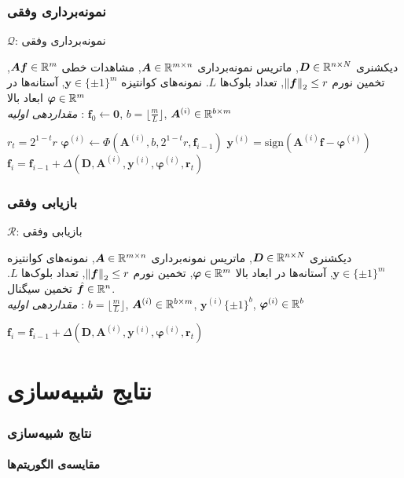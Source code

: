 \begin{frame}
\frametitle{نمونه‌برداری وفقی}
\begin{algorithm}[H]
	\caption{$ \mathcal{Q} $: نمونه‌برداری وفقی}
	\label{alg:AQ}
	\begin{algorithmic}[1]
		\renewcommand{\algorithmicrequire}{\textbf{ورودی:}}
		\renewcommand{\algorithmicensure}{\textbf{خروجی:}}
		\REQUIRE دیکشنری $ \bm{D}\in\mathbb{R}^{n\times N} $, ماتریس نمونه‌برداری $ \bm{A}\in\mathbb{R}^{m\times n} $, مشاهدات خطی $ \bm{Af}\in \mathbb{R}^{m} $, تخمین نورم $ \left\lVert\bm{f}\right\rVert_{2}\leq r $, تعداد بلوک‌ها $ L $.
		\ENSURE  نمونه‌های کوانتیزه $ \bm{y} \in \lbrace\pm 1\rbrace^{m} $, آستانه‌ها در ابعاد بالا $ \bm{\varphi} \in \mathbb{R}^{m} $
		\\ \textit{مقدار‌دهی اولیه} : $ \bm{f}_{0}\leftarrow \bm{0} $, $ b = \lfloor\frac{m}{L}\rfloor $, $ \bm{A}^{(i)}\in \mathbb{R}^{b\times m}  $
		\begin{latin}
		\STATE $r_{t}=2^{1-t}r$
		\STATE $\bm{\varphi}^{\left(i\right)}\leftarrow \Phi(\bm{A}^{(i)},b,2^{1-t}r,\bm{f}_{i-1}) $
		\STATE $ \bm{y}^{\left(i\right)} = \text{sign}\left(\bm{A}^{(i)}\bm{f}-\bm{\varphi}^{\left(i\right)}\right)$
		\STATE $ \bm{f}_{i} = \bm{f}_{i-1} + \varDelta\left(\bm{D},\bm{A}^{(i)},\bm{y}^{\left(i\right)},\bm{\varphi}^{\left(i\right)},\bm{r}_{t}\right) $
		\ENDFOR
		\end{latin}
	\end{algorithmic} 
\end{algorithm}
\end{frame}
\begin{frame}
\frametitle{بازیابی وفقی}
\begin{algorithm}[H]
	\caption{$ \mathcal{R} $: بازیابی وفقی}
	\label{alg:AR}
	\begin{algorithmic}[1]
		\renewcommand{\algorithmicrequire}{\textbf{ورودی:}}
		\renewcommand{\algorithmicensure}{\textbf{خروجی:}}
		\REQUIRE دیکشنری $ \bm{D}\in\mathbb{R}^{n\times N} $, ماتریس نمونه‌برداری $ \bm{A}\in\mathbb{R}^{m\times n} $, نمونه‌های کوانتیزه $ \bm{y} \in \lbrace\pm 1\rbrace^{m} $, آستانه‌ها در ابعاد بالا $ \bm{\varphi}\in\mathbb{R}^{m} $, تخمین نورم $ \left\lVert\bm{f}\right\rVert_{2}\leq r $, تعداد بلوک‌ها $ L $.
		\ENSURE  تخمین سیگنال $ \hat{\bm{f}}\in \mathbb{R}^{n} $.
		\\ \textit{مقداردهی اولیه} :  $ b = \lfloor\frac{m}{L}\rfloor $, $ \bm{A}^{(i)}\in \mathbb{R}^{b\times m}$, $ \bm{y}^{\left(i\right)} \lbrace\pm 1\rbrace^{b}$, $\bm{\varphi}^{\left(i\right)}\in \mathbb{R}^{b} $
		\begin{latin}
		\STATE $ \bm{f}_{i} =\bm{f}_{i-1}+ \varDelta\left(\bm{D},\bm{A}^{(i)},\bm{y}^{\left(i\right)},\bm{\varphi}^{\left(i\right)},\bm{r}_{t}\right) $ 
		\ENDFOR
		\end{latin}
	\end{algorithmic} 
\end{algorithm}
\end{frame}

\section{نتایج شبیه‌سازی\hfill}

\begin{frame}
\frametitle{نتایج شبیه‌سازی}
\framesubtitle{مقایسه‌ی الگوریتم‌ها}
\end{frame}

